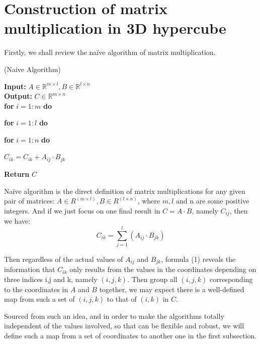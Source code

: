 \documentclass{amsart}
\theoremstyle{definition}
\theoremstyle{remark}
\numberwithin{equation}{section}
\begin{document}
\section{Construction of matrix multiplication in 3D hypercube}
Firstly, we shall review the naïve algorithm of matrix multiplication.\par
\begin{algorithm}[t] 
\caption{(Naive Algorithm)}
\begin{adjustwidth}{0cm}{1cm} 
\textbf{Input:} $A\in \mathbb{R}^{m\times l},B\in \mathbb{R}^{l\times n}$\\
\textbf{Output:} $C\in \mathbb{R}^{m\times n}$\\
\textbf{for} $i=1:m $\textbf{ do}\\
\end{adjustwidth}
	\begin{adjustwidth}{1cm}{1cm}
	\textbf{for} $i=1:l $\textbf{ do}\\
	\end{adjustwidth}
		\begin{adjustwidth}{2cm}{1cm}
		\textbf{for} $i=1:n $\textbf{ do}\\
		\end{adjustwidth}
			\begin{adjustwidth}{3cm}{1cm}
			$C_{ik}=C_{ik}+A_{ij}\cdot B_{jk}$\\
			\end{adjustwidth}
\begin{adjustwidth}{0cm}{1cm} 
\textbf{Return } $C$\\
\end{adjustwidth}
\end{algorithm}
Naïve algorithm is the direct definition of matrix multiplications for any given pair of matrices: $A\in R^{(m\times l)},B\in R^{(l\times n)}$, where $m,l$ and n are some positive integers. And if we just focus on one final result in $C=A\cdot B$, namely $C_{ij}$, then we have:
\begin{equation}
C_{ik}=\sum_{j=1}^{l}(A_{ij}\cdot B_{jk})
\end{equation}

Then regardless of the actual values of $A_{ij}$ and $B_{jk}$, formula (1) reveals the information that $C_{ik}$ only results from the values in the coordinates depending on three indices i,j and k, namely $(i,j,k)$. Then group all $(i,j,k)$ corresponding to the coordinates in $A$ and $B$ together, we may expect there is a well-defined map from such a set of $(i,j,k)$ to that of $(i,k)$ in $C$.\par
Sourced from such an idea, and in order to make the algorithms totally independent of the values involved, so that can be flexible and robust, we will define such a map from a set of coordinates to another one in the first subsection.\par
\end{document}
